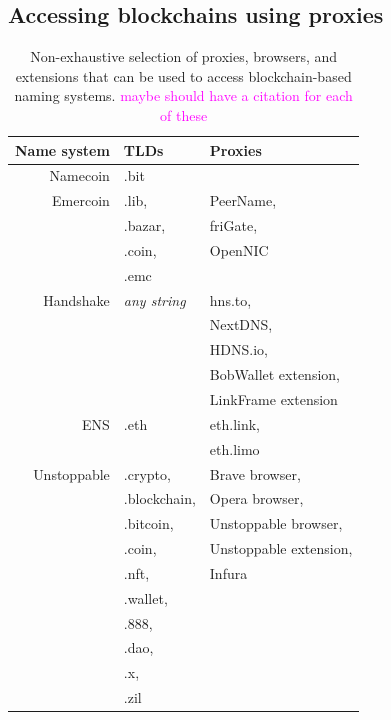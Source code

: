 \documentclass[10pt,sigconf,letterpaper]{acmart}
\newcommand{\randall}{\ding{110}\ding{43}\textcolor{magenta}}
\newcommand{\randall}{}
\begin{document}



\subsection{Accessing blockchains using proxies}

\begin{table}
	\begin{tabular}{r l l}
		\toprule
		Name system & TLDs & Proxies \\
		\midrule
		Namecoin & .bit & \\
		Emercoin & .lib, & PeerName,  \\
		& .bazar, & friGate, \\
		& .coin, & OpenNIC \\
		& .emc & \\
		Handshake & \emph{any string} & hns.to, \\
		& & NextDNS, \\
		& & HDNS.io,\\
		& & BobWallet extension, \\
		& & LinkFrame extension \\
		ENS & .eth & eth.link, \\
		& & eth.limo \\
		Unstoppable & .crypto, & Brave browser, \\
		& .blockchain, & Opera browser, \\
		& .bitcoin, & Unstoppable browser, \\
		& .coin, & Unstoppable extension, \\
		& .nft, & Infura\\
		& .wallet, & \\
		& .888, & \\
		& .dao, & \\
		& .x, & \\
		& .zil & \\
		\bottomrule
	\end{tabular}
	\caption{Non-exhaustive selection of proxies, browsers, 
	and extensions 
	that can be used to access blockchain-based naming 
	systems. \randall{maybe should have a citation for each 
	of these}}
	\label{tab:proxies_and_tlds}
\end{table}
\end{document}
